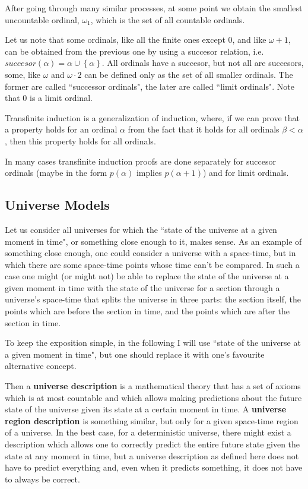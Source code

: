 \documentclass[a4paper
,draft
]{article}
\newcommand{\multime}[1]{\left\{ #1 \right\}}
\newcommand{\definitie}[1]{\textbf{#1}}
\newcommand{\ghilimele}[1]{``#1"}
\begin{document}
After going through many similar processes, at some point we obtain the
smallest uncountable ordinal, $\omega_1$, which is the set of all
countable ordinals.

Let us note that some ordinals, like all the finite ones except $0$,
and like $\omega+1$, can be obtained from the previous one by using
a succesor relation, i.e. $succesor(\alpha) = \alpha\cup\multime{\alpha}$.
All ordinals have a succesor, but not all are succesors, some, like
$\omega$ and $\omega\cdot 2$ can be defined only as the set of all
smaller ordinals. The former are called \ghilimele{successor ordinals},
the later are called \ghilimele{limit ordinals}. Note that $0$ is a limit
ordinal.

Transfinite induction is a generalization of induction, where, if we can
prove that a property holds for an ordinal $\alpha$ from the fact that
it holds for all ordinals $\beta<\alpha$, then this property holds for
all ordinals.

In many cases transfinite induction proofs are done separately for
succesor ordinals (maybe in the form $p(\alpha)$ implies $p(\alpha+1)$)
and for limit ordinals.

\subsection{Universe Models}

Let us consider all universes for which the
\ghilimele{state of the universe at a given moment in time},
or something close enough to it, makes sense. As an example of something
close enough, one could consider a universe with a space-time,
but in which there are some space-time points whose time can't be compared.
In such a case one might (or might not) be able to replace the state of
the universe at a given moment in time with the state of the universe
for a section through a universe's space-time that splits the universe
in three parts: the section itself, the points which are before the
section in time, and the points which are after the section in time.

To keep the exposition simple, in the following I will use
\ghilimele{state of the universe at a given moment in time},
but one should replace it with one's favourite alternative concept.

Then a \definitie{universe description} is a mathematical theory that has
a set of axioms which is at most countable and which allows making
predictions about the future state of the universe given its state
at a certain moment in time. A \definitie{universe region description}
is something similar, but only for a given space-time region of a universe.
In the best case, for a deterministic universe, there might exist
a description which allows one to correctly predict the entire future state
given the state at any moment in time, but a universe description
as defined here does not have to predict everything and,
even when it predicts something, it does not have to always be correct.
\end{document}
